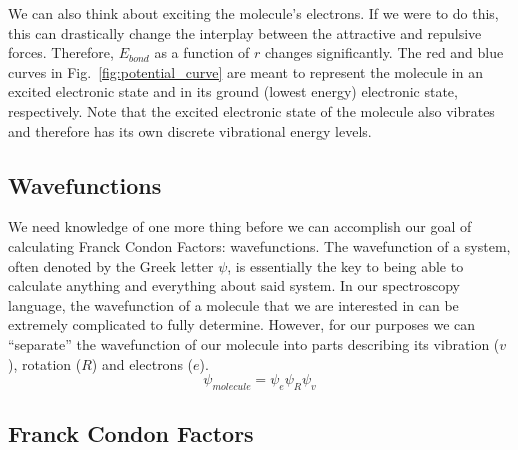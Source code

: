 \documentclass[12pt]{article}
\begin{document}
We can also think about exciting the molecule's electrons. If we were to do this, this can drastically change the interplay between the attractive and repulsive forces. Therefore, $E_{bond}$ as a function of $r$ changes significantly. The red and blue curves in Fig.~\ref{fig:potential_curve} are meant to represent the molecule in an excited electronic state and in its ground (lowest energy) electronic state, respectively. Note that the excited electronic state of the molecule also vibrates and therefore has its own discrete vibrational energy levels.

\subsection{Wavefunctions}

We need knowledge of one more thing before we can accomplish our goal of calculating Franck Condon Factors: wavefunctions. The wavefunction of a system, often denoted by the Greek letter $\psi$, is essentially the key to being able to calculate anything and everything about said system. In our spectroscopy language, the wavefunction of a molecule that we are interested in can be extremely complicated to fully determine. However, for our purposes we can ``separate'' the wavefunction of our molecule into parts describing its vibration ($v$), rotation ($R$) and electrons ($e$).
\begin{equation}
    \psi_{molecule} = \psi_e\psi_R\psi_v
\end{equation}

\subsection{Franck Condon Factors}
\end{document}
